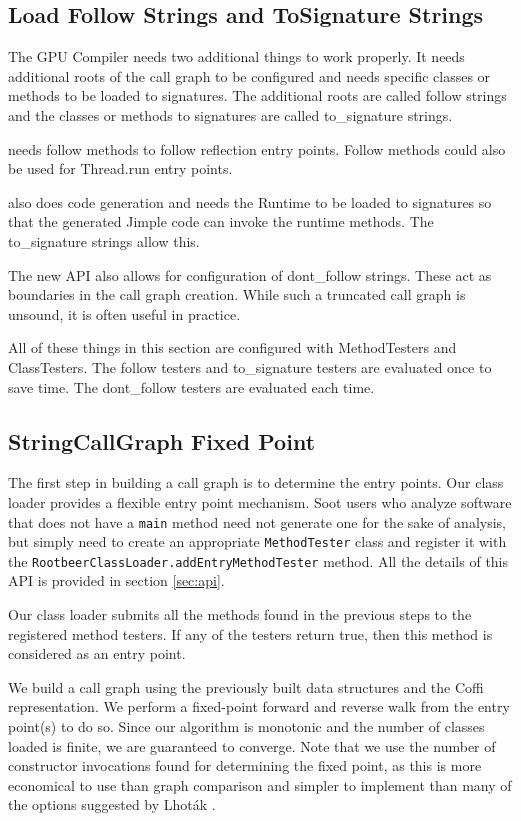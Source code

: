 \documentclass[preprint]{sigplanconf}
\begin{document}
\subsection{Load Follow Strings and ToSignature Strings}
\label{sec:followtosig}
The \rb GPU Compiler needs two additional things to work properly. It needs additional roots of the call graph to be configured and needs specific classes or methods to be loaded to signatures. The additional roots are called follow strings and the classes or methods to signatures are called to\_signature strings.

\rb needs follow methods to follow reflection entry points. Follow methods could also be used for Thread.run entry points.
 
\rb also does code generation and needs the \rb Runtime to be loaded to signatures so that the generated Jimple code can invoke the runtime methods. The to\_signature strings allow this. 

The new API also allows for configuration of dont\_follow strings. These act as boundaries in the call graph creation. While such a truncated call graph is unsound, it is often useful in practice.

All of these things in this section are configured with MethodTesters and ClassTesters. The follow testers and to\_signature testers are evaluated once to save time. The dont\_follow testers are evaluated each time.


\subsection{StringCallGraph Fixed Point}
\label{sec:cg}
The first step in building a call graph is to determine the entry points. Our class loader provides a flexible entry point mechanism. Soot users who analyze software that does not have a {\tt main} method need not generate one for the sake of analysis, but simply need to create an appropriate {\tt MethodTester} class and register it with the {\tt RootbeerClassLoader.addEntryMethodTester} method. All the details of this API is provided in section \ref{sec:api}.

Our class loader submits all the methods found in the previous steps to the registered method testers. If any of the testers return true, then this method is considered as an entry point.

We build a call graph using the previously built data structures and the Coffi representation. We perform a fixed-point forward and reverse walk from the entry point(s) to do so. Since our algorithm is monotonic and the number of classes loaded is finite, we are guaranteed to converge. Note that we use the number of constructor invocations found for determining the fixed point, as this is more economical to use than graph comparison and simpler to implement than many of the options suggested by Lhoták \cite{lhot02}.
\end{document}
